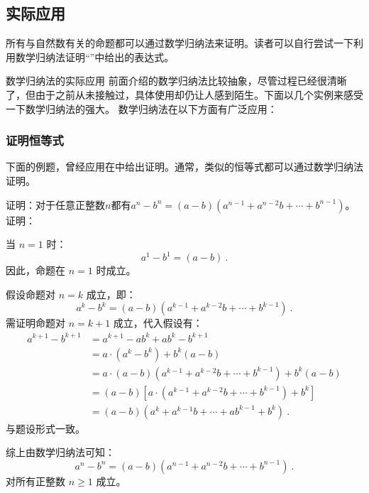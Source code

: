 \subsection{实际应用}


所有与自然数有关的命题都可以通过数学归纳法来证明。读者可以自行尝试一下利用数学归纳法证明“”中给出的表达式。

数学归纳法的实际应用
前面介绍的数学归纳法比较抽象，尽管过程已经很清晰了，但由于之前从未接触过，具体使用却仍让人感到陌生。下面以几个实例来感受一下数学归纳法的强大。
数学归纳法在以下方面有广泛应用：

\subsubsection{证明恒等式}
下面的例题，曾经应用在中给出证明。通常，类似的恒等式都可以通过数学归纳法证明。
\begin{example}{证明：对于任意正整数$n$都有$a^n-b^n=\left(a-b\right)\left(a^{n-1}+a^{n-2}b+\cdots+b^{n-1}\right)$。}
证明：

当 $n = 1$ 时：
\begin{equation}
a^1 - b^1 = (a - b)~.
\end{equation}
因此，命题在 $n = 1$ 时成立。

假设命题对 $n = k$ 成立，即：
\begin{equation}
a^k - b^k = (a - b)\left(a^{k-1} + a^{k-2}b + \cdots + b^{k-1}\right)~.
\end{equation}
需证明命题对 $n = k+1$ 成立，代入假设有：
\begin{equation}
\begin{aligned}
a^{k+1} - b^{k+1} &= a^{k+1}-ab^k+ab^k - b^{k+1}\\
&= a \cdot (a^k - b^k) + b^k(a - b)\\
&=a \cdot (a - b)\left(a^{k-1} + a^{k-2}b + \cdots + b^{k-1}\right) + b^k(a - b)\\
&=(a - b)\left[a \cdot \left(a^{k-1} + a^{k-2}b + \cdots + b^{k-1}\right) + b^k\right]\\
&=(a - b)\left(a^{k} + a^{k-1}b + \cdots + ab^{k-1} + b^k\right)~.
\end{aligned}
\end{equation}
与题设形式一致。

综上由数学归纳法可知：
\begin{equation}
a^n - b^n = (a - b)\left(a^{n-1} + a^{n-2}b + \cdots + b^{n-1}\right)~.
\end{equation}
对所有正整数 $n \geq 1$ 成立。
\end{example}

